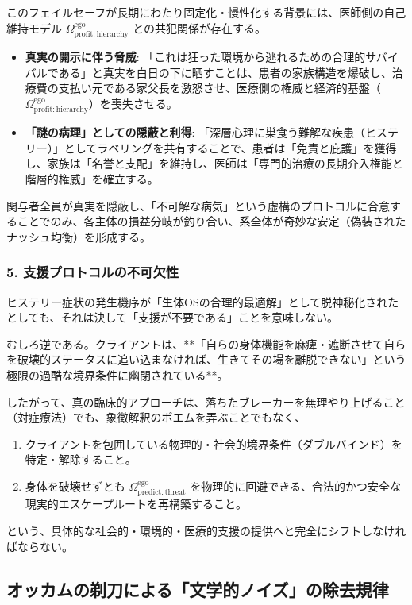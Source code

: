 このフェイルセーフが長期にわたり固定化・慢性化する背景には、医師側の自己維持モデル $\Omega^{\mathrm{ego}}_{\mathrm{profit:hierarchy}}$ との共犯関係が存在する。

\begin{itemize}
    \item \textbf{真実の開示に伴う脅威}:
    「これは狂った環境から逃れるための合理的サバイバルである」と真実を白日の下に晒すことは、患者の家族構造を爆破し、治療費の支払い元である家父長を激怒させ、医療側の権威と経済的基盤（$\Omega^{\mathrm{ego}}_{\mathrm{profit:hierarchy}}$）を喪失させる。
    \item \textbf{「謎の病理」としての隠蔽と利得}:
    「深層心理に巣食う難解な疾患（ヒステリー）」としてラベリングを共有することで、患者は「免責と庇護」を獲得し、家族は「名誉と支配」を維持し、医師は「専門的治療の長期介入権能と階層的権威」を確立する。
\end{itemize}

関与者全員が真実を隠蔽し、「不可解な病気」という虚構のプロトコルに合意することでのみ、各主体の損益分岐が釣り合い、系全体が奇妙な安定（偽装されたナッシュ均衡）を形成する。

\subsubsection{5. 支援プロトコルの不可欠性}

ヒステリー症状の発生機序が「生体OSの合理的最適解」として脱神秘化されたとしても、それは決して「支援が不要である」ことを意味しない。

むしろ逆である。クライアントは、**「自らの身体機能を麻痺・遮断させて自らを破壊的ステータスに追い込まなければ、生きてその場を離脱できない」という極限の過酷な境界条件に幽閉されている**。

したがって、真の臨床的アプローチは、落ちたブレーカーを無理やり上げること（対症療法）でも、象徴解釈のポエムを弄ぶことでもなく、
\begin{enumerate}
    \item クライアントを包囲している物理的・社会的境界条件（ダブルバインド）を特定・解除すること。
    \item 身体を破壊せずとも $\Omega^{\mathrm{ego}}_{\mathrm{predict:threat}}$ を物理的に回避できる、合法的かつ安全な現実的エスケープルートを再構築すること。
\end{enumerate}
という、具体的な社会的・環境的・医療的支援の提供へと完全にシフトしなければならない。

\subsection{オッカムの剃刀による「文学的ノイズ」の除去規律}

